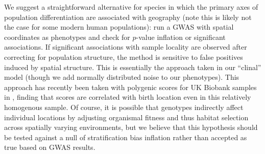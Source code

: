 \documentclass[10pt,twoside,lineno,hidelinks]{preprint}
\begin{document}
We suggest a straightforward alternative for species in which the primary axes of population differentiation
are associated with geography (note this is likely not the case for some modern human populations): 
run a GWAS with spatial coordinates as phenotypes and check for $p$-value inflation or significant associations.
If significant associations with sample locality are observed after correcting for population structure, 
the method is sensitive to false positives induced by spatial structure. This is essentially the approach taken in our ``clinal'' model (though we add normally distributed noise to our phenotypes). This approach has recently been taken with polygenic scores for UK Biobank samples in \citet{haworth2019apparent}, finding that scores are correlated with birth location even in this relatively homogenous sample. 
Of course, it is possible that genotypes indirectly affect individual locations by adjusting organismal fitness and thus habitat selection across spatially varying environments, but we believe that this hypothesis should be tested against a null of stratification bias inflation rather than accepted as true based on GWAS results.  


\end{document}
